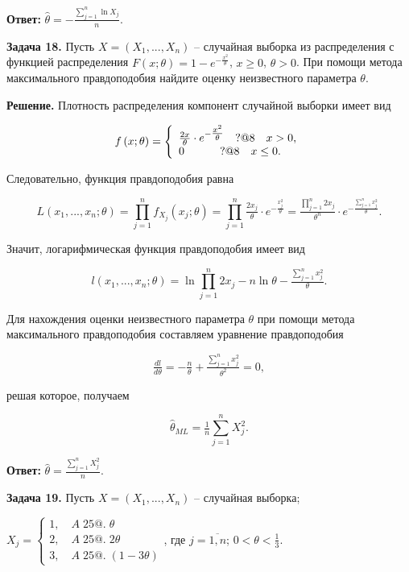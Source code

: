\textbf{Ответ: }$\widehat{\theta }=-\frac{\sum _{j=1}^{n}\ln X_{j}  }{n} $.



\textbf{Задача 18.} Пусть $X=\left(X_{1} ,...,X_{n} \right)$ -- случайная выборка из распределения с функцией распределения $F\left(x;\theta \right)=1-e^{-{\tfrac{x^{2} }{\theta }} } $, $x\ge 0$, $\theta >0$. При помощи метода максимального правдоподобия найдите оценку неизвестного параметра $\theta $.

\textbf{Решение. }Плотность распределения компонент случайной выборки имеет вид 

\[f\left(x;\theta \right)=\left\{\begin{array}{l} {{\tfrac{2x}{\theta }} \cdot e^{-{\tfrac{x^{2} }{\theta }} } \quad {\rm ?@8}\quad x>0,} \\ {0\quad \quad \quad \, {\rm ?@8}\quad x\le 0.} \end{array}\right. \] 

Следовательно, функция правдоподобия равна

\[L\left(x_{1} ,...,x_{n} ;\theta \right)=\prod _{j=1}^{n}f_{X_{j} } \left(x_{j} ;\theta \right) =\prod _{j=1}^{n}{\tfrac{2x_{j} }{\theta }} \cdot e^{-{\tfrac{x_{j}^{2} }{\theta }} }  ={\tfrac{\prod _{j=1}^{n}2x_{j}  }{\theta ^{n} }} \cdot e^{-{\tfrac{\sum _{j=1}^{n}x_{j}^{2}  }{\theta }} } .\] 

Значит, логарифмическая функция правдоподобия имеет вид

\[l\left(x_{1} ,...,x_{n} ;\theta \right)=\ln \prod _{j=1}^{n}2x_{j}  -n\ln \theta -{\tfrac{\sum _{j=1}^{n}x_{j}^{2}  }{\theta }} .\] 

Для нахождения оценки неизвестного параметра $\theta $ при помощи метода максимального правдоподобия составляем уравнение правдоподобия

\[{\tfrac{dl}{d\theta }} =-{\tfrac{n}{\theta }} +{\tfrac{\sum _{j=1}^{n}x_{j}^{2}  }{\theta ^{2} }} =0,\] 

решая которое, получаем

\[\widehat{\theta }_{ML} ={\tfrac{1}{n}} \sum _{j=1}^{n}X_{j}^{2}  .\] 

\textbf{Ответ: }$\widehat{\theta }=\frac{\sum _{j=1}^{n}X_{j}^{2}  }{n} $. 



\textbf{Задача 19.} Пусть $X=\left(X_{1} ,...,X_{n} \right)$ -- случайная выборка; 

$X_{j} =\left\{\begin{array}{l} {1,\quad A\; 25@.\; \theta } \\ {2,\quad A\; 25@.\; 2\theta } \\ {3,\quad A\; 25@.\; \left(1-3\theta \right)} \end{array}\right. $, где $j=\overline{1,n}$; $0<\theta <{\tfrac{1}{3}} $.

